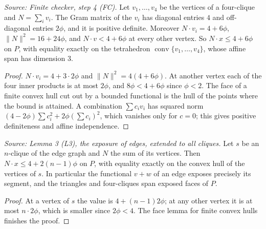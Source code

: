 \begin{lemma}
  \label{lem:supporting-facet}
  \leanok
  \textit{Source: Finite checker, step 4 (FC).}
  Let \(v_1,\ldots,v_4\) be the vertices of a four-clique and
  \(N=\sum_iv_i\). The Gram matrix of the \(v_i\) has diagonal entries
  \(4\) and off-diagonal entries \(2\phi\), and it is positive definite.
  Moreover \(N\cdot v_i=4+6\phi\), \(\|N\|^2=16+24\phi\), and
  \(N\cdot v<4+6\phi\) at every other vertex. So \(N\cdot x\le4+6\phi\) on
  \(P\), with equality exactly on the tetrahedron
  \(\operatorname{conv}\{v_1,\ldots,v_4\}\), whose affine span has
  dimension \(3\).
\end{lemma}
\begin{proof}
  \leanok
  \(N\cdot v_i=4+3\cdot2\phi\) and \(\|N\|^2=4(4+6\phi)\). At another
  vertex each of the four inner products is at most \(2\phi\), and
  \(8\phi<4+6\phi\) since \(\phi<2\). The face of a finite convex hull
  cut out by a bounded functional is the hull of the points where the
  bound is attained. A combination \(\sum c_iv_i\) has squared norm
  \((4-2\phi)\sum c_i^2+2\phi(\sum c_i)^2\), which vanishes only for
  \(c=0\); this gives positive definiteness and affine independence.
\end{proof}

\begin{lemma}
  \label{lem:clique-face}
  \leanok
  \textit{Source: Lemma 3 (L3), the exposure of edges, extended to all cliques.}
  Let \(s\) be an \(n\)-clique of the edge graph and \(N\) the sum of its
  vertices. Then \(N\cdot x\le4+2(n-1)\phi\) on \(P\), with equality
  exactly on the convex hull of the vertices of \(s\). In particular the
  functional \(v+w\) of an edge exposes precisely its segment, and the
  triangles and four-cliques span exposed faces of \(P\).
\end{lemma}
\begin{proof}
  \leanok
  At a vertex of \(s\) the value is \(4+(n-1)2\phi\); at any other vertex
  it is at most \(n\cdot2\phi\), which is smaller since \(2\phi<4\). The
  face lemma for finite convex hulls finishes the proof.
\end{proof}

